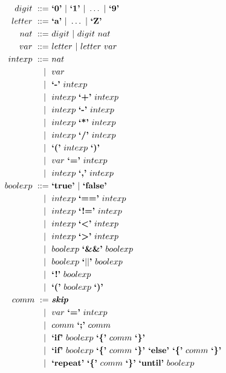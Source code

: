 \documentclass[11pt]{article}
\begin{document}
\begin{align*}
    digit\ ::=\ & \textbf{`0'}\ |\ \textbf{`1'}\ |\ \dots\ |\ \textbf{`9'} \\
    letter\ ::=\ & \textbf{`a'}\ |\ \dots\ |\ \textbf{`Z'} \\
    nat\ ::=\ & digit\ |\ digit\ nat \\
    var\ ::=\ & letter\ |\ letter\ var \\
    intexp\ ::=\ & nat \\
            |\ \ & var \\
            |\ \ & \textbf{`-'}\ intexp \\
            |\ \ & intexp\ \textbf{`+'}\ intexp \\ 
            |\ \ & intexp\ \textbf{`-'}\ intexp \\ 
            |\ \ & intexp\ \textbf{`*'}\ intexp \\ 
            |\ \ & intexp\ \textbf{`/'}\ intexp \\ 
            |\ \ & \textbf{`('}\ intexp\ \textbf{`)'} \\
            |\ \ & var\ \textbf{`='}\ intexp \\
            |\ \ & intexp\ \textbf{`,'}\ intexp \\
    boolexp\ ::=\ & \textbf{`true'}\ |\ \textbf{`false'} \\
             |\ \ & intexp\ \textbf{`=='}\ intexp \\
             |\ \ & intexp\ \textbf{`!='}\ intexp \\
             |\ \ & intexp\ \textbf{`\textless'}\ intexp \\
             |\ \ & intexp\ \textbf{`\textgreater'}\ intexp \\
             |\ \ & boolexp\ \textbf{`\&\&'}\ boolexp \\
             |\ \ & boolexp\ \textbf{`$||$'}\ boolexp \\
             |\ \ & \textbf{`!'}\ boolexp \\
             |\ \ & \textbf{`('}\ boolexp\ \textbf{`)'} \\
    comm\ :=\ & \textbf{\emph{skip}} \\
          |\ \ & var\ \textbf{`='}\ intexp \\
          |\ \ & comm\ \textbf{`;'}\ comm \\
          |\ \ & \textbf{`if'}\ boolexp\ \textbf{`\{'}\ comm\ \textbf{`\}'} \\
          |\ \ & \textbf{`if'}\ boolexp\ \textbf{`\{'}\ comm\ \textbf{`\}' `else' `\{'}\ comm \ \textbf{`\}'} \\
          |\ \ & \textbf{`repeat'}\ \textbf{`\{'} \ comm\ \textbf{`\}'} \ \textbf{`until'}\ boolexp\
\end{align*}
\end{document}
